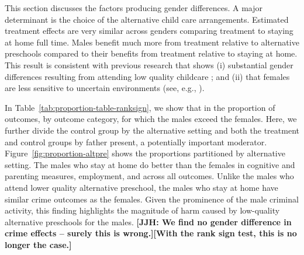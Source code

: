 This section discusses the factors producing gender differences. A major determinant is the choice of the alternative child care arrangements.
Estimated treatment effects are very similar across genders comparing treatment to staying at home full time. Males benefit much more from treatment relative to alternative preschools compared to their benefits from treatment relative to staying at home. This result is consistent with previous research that shows (i) substantial gender differences resulting from attending low quality childcare \citep{Kottelenberg-Lehrer_2014_Gender-Effects,Baker_Gruber_Milligan_2015_Noncog_Defects}; and (ii) that females are less sensitive to uncertain environments (see, e.g., \citealp{golding2016psychology,Autor-etal_2015_Family-Disadvantage}).

In Table~\ref{tab:proportion-table-ranksign}, we show that in the proportion of outcomes, by outcome category, for which the males exceed the females. Here, we further divide the control group by the alternative setting and both the treatment and control groups by father present, a potentially important moderator. Figure~\ref{fig:proportion-altpre} shows the proportions partitioned by alternative setting. The males who stay at home do better than the females in cognitive and parenting measures, employment, and across all outcomes. Unlike the males who attend lower quality alternative preschool, the males who stay at home have similar crime outcomes as the females. Given the prominence of the male criminal activity, this finding highlights the magnitude of harm caused by low-quality alternative preschools for the males. \textbf{[JJH: We find no gender difference in crime effects -- surely this is wrong.][With the rank sign test, this is no longer the case.]}


